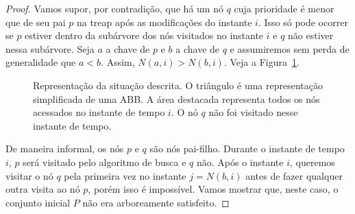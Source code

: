 \begin{proof}
Vamos supor, por contradição, que há um nó $q$ cuja prioridade é menor que de seu pai $p$ na treap após as modificações do instante $i$. Isso só pode ocorrer se $p$ estiver dentro da subárvore dos nós visitados no instante $i$ e $q$ não estiver nessa subárvore. Seja $a$ a chave de $p$ e $b$ a chave de $q$ e assumiremos sem perda de generalidade que $a < b$. Assim, $N(a,i) > N(b,i)$. Veja a Figura~\ref{fig:representacao_grafica}.


\begin{figure}[H]
    \caption{Representação da situação descrita. O triângulo é uma representação simplificada de uma ABB. A área destacada representa todos os nós acessados no instante de tempo $i$. O nó $q$ não foi visitado nesse instante de tempo.}
\label{fig:representacao_grafica}
\end{figure}
De maneira informal, os nós $p$ e $q$ são nós pai-filho. Durante o instante de tempo $i$, $p$ será visitado pelo algoritmo de busca e $q$ não. Após o instante $i$, queremos visitar o nó $q$ pela primeira vez no instante $j = N(b,i)$ antes de fazer qualquer outra visita ao nó $p$, porém isso é impossível. Vamos mostrar que, neste caso, o conjunto inicial $P$ não era arboreamente satisfeito.


\end{proof}
